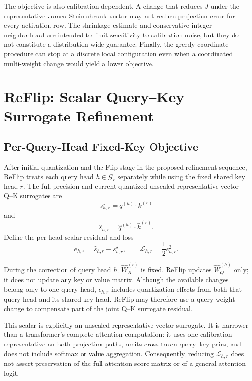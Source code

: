 The objective is also calibration-dependent. A change that reduces $J$ under the representative James--Stein-shrunk vector may not reduce projection error for every activation row. The shrinkage estimate and conservative integer neighborhood are intended to limit sensitivity to calibration noise, but they do not constitute a distribution-wide guarantee. Finally, the greedy coordinate procedure can stop at a discrete local configuration even when a coordinated multi-weight change would yield a lower objective.

\section{ReFlip: Scalar Query--Key Surrogate Refinement}

\subsection{Per-Query-Head Fixed-Key Objective}

After initial quantization and the Flip stage in the proposed refinement sequence, ReFlip treats each query head $h\in\mathcal{G}_r$ separately while using the fixed shared key head $r$. The full-precision and current quantized unscaled representative-vector Q--K surrogates are
\begin{equation}
s_{h,r}^\star
=q^{(h)}\cdot k^{(r)}
\end{equation}
and
\begin{equation}
\hat{s}_{h,r}
=\hat q^{(h)}\cdot\hat k^{(r)}.
\end{equation}
Define the per-head scalar residual and loss
\begin{equation}
e_{h,r}=\hat{s}_{h,r}-s_{h,r}^\star,
\qquad
\mathcal{L}_{h,r}=\frac{1}{2}e_{h,r}^2.
\end{equation}

During the correction of query head $h$, $\hat W_K^{(r)}$ is fixed. ReFlip updates $\hat W_Q^{(h)}$ only; it does not update any key or value matrix. Although the available changes belong only to one query head, $e_{h,r}$ includes quantization effects from both that query head and its shared key head. ReFlip may therefore use a query-weight change to compensate part of the joint Q--K surrogate residual.

This scalar is explicitly an unscaled representative-vector surrogate. It is narrower than a transformer's complete attention computation: it uses one calibration representative on both projection paths, omits cross-token query--key pairs, and does not include softmax or value aggregation. Consequently, reducing $\mathcal{L}_{h,r}$ does not assert preservation of the full attention-score matrix or of a general attention logit.

